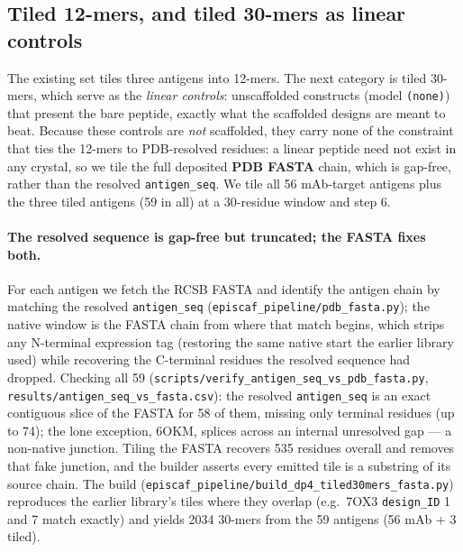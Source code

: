 \subsection{Tiled 12-mers, and tiled 30-mers as linear controls}
The existing set tiles three antigens into 12-mers. The next category is tiled 30-mers,
which serve as the \emph{linear controls}: unscaffolded constructs (model \texttt{(none)})
that present the bare peptide, exactly what the scaffolded designs are meant to beat. Because
these controls are \emph{not} scaffolded, they carry none of the constraint that ties the
12-mers to PDB-resolved residues: a linear peptide need not exist in any crystal, so we tile
the full deposited \textbf{PDB FASTA} chain, which is gap-free, rather than the resolved
\texttt{antigen\_seq}. We tile all 56 mAb-target antigens plus the three tiled antigens (59 in all)
at a 30-residue window and step 6.

\paragraph{The resolved sequence is gap-free but truncated; the FASTA fixes both.} For each
antigen we fetch the RCSB FASTA and identify the antigen chain by matching the resolved
\texttt{antigen\_seq} (\texttt{episcaf\_pipeline/pdb\_fasta.py}); the native window is the FASTA
chain from where that match begins, which strips any N-terminal expression tag (restoring the
same native start the earlier library used) while recovering the C-terminal residues the
resolved sequence had dropped. Checking all 59
(\texttt{scripts/verify\_antigen\_seq\_vs\_pdb\_fasta.py},
\texttt{results/antigen\_seq\_vs\_fasta.csv}): the resolved \texttt{antigen\_seq} is an exact
contiguous slice of the FASTA for 58 of them, missing only terminal residues (up to 74); the
lone exception, 6OKM, splices across an internal unresolved gap --- a non-native junction.
Tiling the FASTA recovers \num{535} residues overall and removes that fake junction, and the
builder asserts every emitted tile is a substring of its source chain. The build
(\texttt{episcaf\_pipeline/build\_dp4\_tiled30mers\_fasta.py}) reproduces the earlier library's
tiles where they overlap (e.g.\ 7OX3 \texttt{design\_ID} 1 and 7 match exactly) and yields
\num{2034} 30-mers from the 59 antigens (56 mAb + 3 tiled).

